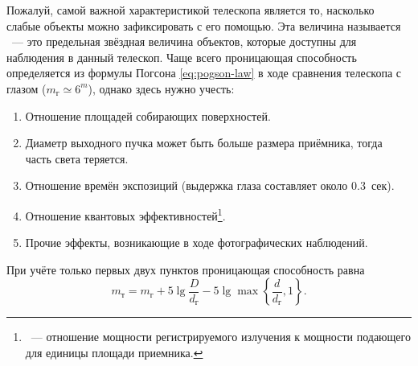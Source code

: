 Пожалуй, самой важной характеристикой телескопа является то, насколько слабые объекты можно зафиксировать с его помощью. Эта величина называется ~--- это предельная звёздная величина объектов, которые доступны для наблюдения в данный телескоп. Чаще всего проницающая способность определяется из формулы Погсона \eqref{eq:pogson-law} в ходе сравнения телескопа с глазом ($m_\text{г} \simeq 6^m$), однако здесь нужно учесть:
\begin{enumerate}
    \item Отношение площадей собирающих поверхностей.
    \item Диаметр выходного пучка может быть больше размера приёмника, тогда часть света теряется.
    \item Отношение времён экспозиций (выдержка глаза составляет около 0.3~сек).
    \item Отношение квантовых эффективностей\footnote{~--- отношение мощности регистрируемого излучения к мощности подающего для единицы площади приемника.}.
    \item Прочие эффекты, возникающие в ходе фотографических наблюдений.
\end{enumerate}
При учёте только первых двух пунктов проницающая способность равна
\begin{equation}
    m_\text{т} = m_\text{г} + 5\lg\frac{D}{d_\text{г}} - 5\lg\max \left\{ \frac{d}{d_\text{г}}, 1\right\}.
\end{equation}
